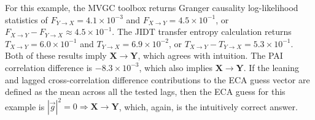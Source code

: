 \documentclass{article}[10pt]
\begin{document}
For this example, the MVGC toolbox returns Granger causality log-likelihood statistics of $F_{Y\rightarrow X}=4.1\times 10^{-3}$ and $F_{X\rightarrow Y}=4.5\times 10^{-1}$, or $F_{X\rightarrow Y}-F_{Y\rightarrow X}\approx4.5\times 10^{-1}$.  The JIDT transfer entropy calculation returns $T_{X\rightarrow Y}=6.0\times 10^{-1}$ and $T_{Y\rightarrow X}=6.9\times 10^{-2}$, or $T_{X\rightarrow Y}-T_{Y\rightarrow X}=5.3\times 10^{-1}$.  Both of these results imply $\mathbf{X}\rightarrow\mathbf{Y}$, which agrees with intuition.  The PAI correlation difference is $-8.3\times 10^{-3}$, which also implies $\mathbf{X}\rightarrow\mathbf{Y}$.  If the leaning and lagged cross-correlation difference contributions to the ECA guess vector are defined as the mean across all the tested lags, then the ECA guess for this example is $|\vec{g}|^2=0\Rightarrow \mathbf{X}\rightarrow\mathbf{Y}$, which, again, is the intuitively correct answer.  
\end{document}
